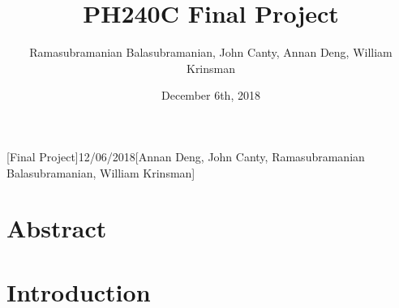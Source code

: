 





\headerfooter{}[Final Project]{}{12/06/2018}[Annan Deng, John Canty, Ramasubramanian Balasubramanian, William Krinsman]

\newcommand{\code}[1]{\mbox{\texttt{#1}}}


\renewcommand{\thesubsection}{ \arabic{subsection}.}
\renewcommand{\thesubsubsection}{(\alph{subsubsection})}




\title{PH240C Final Project \break{} \break {} }
\date{December 6th, 2018}
\author{Ramasubramanian Balasubramanian, John Canty, Annan Deng, William Krinsman}

\maketitle

\section*{Abstract}
\label{sec:abstract}


\pagebreak

\tableofcontents

\pagebreak

\section{Introduction}
\label{sec:introduction}

